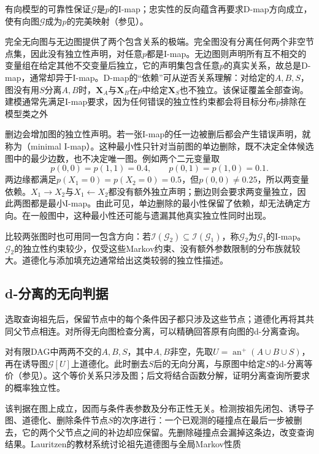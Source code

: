有向模型的可靠性保证$\mathcal{G}$是$p$的I-map；忠实性的反向蕴含再要求D-map方向成立，使有向图$\mathcal{G}$成为$p$的完美映射（参见）。

完全无向图与无边图提供了两个包含关系的极端。完全图没有分离任何两个非空节点集，因此没有独立性声明，对任意$p$都是I-map。无边图则声明所有互不相交的变量组在给定其他不交变量后独立，它的声明集包含任意$p$的真实关系，故总是D-map，通常却异于I-map。D-map的“依赖”可从逆否关系理解：对给定的$A,B,S$，图没有用$S$分离$A,B$时，$\bm{X}_A$与$\bm{X}_B$在$p$中给定$\bm{X}_S$也不独立。该保证覆盖全部查询。建模通常先满足I-map要求，因为任何错误的独立性约束都会将目标分布$p$排除在模型类之外

删边会增加图的独立性声明。若一张I-map的任一边被删后都会产生错误声明，就称为（minimal I-map）。这种最小性只针对当前图的单边删除，既不决定全体候选图中的最少边数，也不决定唯一图。例如两个二元变量取
\[
  p(0,0)=p(1,1)=0.4,\qquad
  p(0,1)=p(1,0)=0.1.
\]
两边缘都满足$p(X_1=0)=p(X_2=0)=0.5$，但$p(0,0)\ne0.25$，所以两变量依赖。$X_1\to X_2$与$X_1\leftarrow X_2$都没有额外独立声明；删边则会要求两变量独立，因此两图都是最小I-map。由此可见，单边删除的最小性保留了依赖，却无法确定方向。在一般图中，这种最小性还可能与遗漏其他真实独立性同时出现。

比较两张图时也可用同一包含方向：若$\mathcal{I}(\mathcal{G}_2)\subseteq\mathcal{I}(\mathcal{G}_1)$，称$\mathcal{G}_2$为$\mathcal{G}_1$的I-map。$\mathcal{G}_2$的独立性约束较少，仅受这些Markov约束、没有额外参数限制的分布族就较大。道德化与添加填充边通常给出这类较弱的独立性描述。

\subsection{d-分离的无向判据}
\label{sec:pgm-representations-ancestral-moralization}

选取查询祖先后，保留节点中的每个条件因子都只涉及这些节点；道德化再将其共同父节点相连。对所得无向图检查分离，可以精确回答原有向图的d-分离查询。

对有限DAG中两两不交的$A,B,S$，其中$A,B$非空，先取$U=\operatorname{an}^{+}(A\cup B\cup S)$，再在诱导图$\mathcal G[U]$上道德化。此时删去$S$后的无向分离，与原图中给定$S$的d-分离等价（参见）。这个等价关系只涉及图；后文将结合函数分解，证明分离查询所要求的概率独立性。

该判据在图上成立，因而与条件表参数及分布正性无关。检测按祖先闭包、诱导子图、道德化、删除条件节点$S$的次序进行：一个已观测的碰撞点在最后一步被删去，它的两个父节点之间的补边却应保留。先删除碰撞点会漏掉这条边，改变查询结果。Lauritzen的教材系统讨论祖先道德图与全局Markov性质

